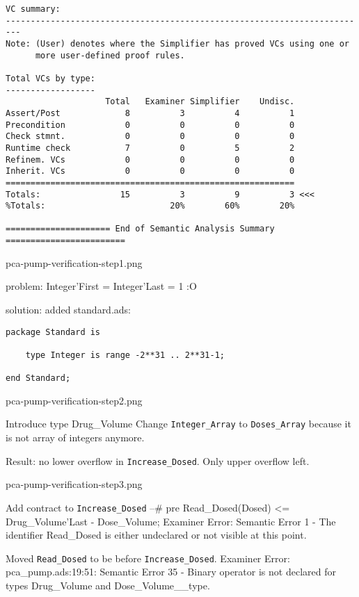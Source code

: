 \begin{lstlisting}
VC summary:
-------------------------------------------------------------------------
Note: (User) denotes where the Simplifier has proved VCs using one or
      more user-defined proof rules.

Total VCs by type:
------------------
                    Total   Examiner Simplifier    Undisc.
Assert/Post             8          3          4          1
Precondition            0          0          0          0
Check stmnt.            0          0          0          0
Runtime check           7          0          5          2
Refinem. VCs            0          0          0          0
Inherit. VCs            0          0          0          0
==========================================================
Totals:                15          3          9          3 <<<
%Totals:                         20%        60%        20%

===================== End of Semantic Analysis Summary ========================

\end{lstlisting}

pca-pump-verification-step1.png

problem: Integer'First = Integer'Last = 1 :O

solution: added standard.ads:

\begin{lstlisting}
package Standard is

    type Integer is range -2**31 .. 2**31-1;

end Standard;
\end{lstlisting}

pca-pump-verification-step2.png

Introduce type Drug\_Volume
Change \lstinline{Integer_Array} to \lstinline{Doses_Array} because it is not array of integers anymore.

Result: no lower overflow in \lstinline{Increase_Dosed}. Only upper overflow left.

pca-pump-verification-step3.png

Add contract to \lstinline{Increase_Dosed} --# pre Read_Dosed(Dosed) <= Drug_Volume'Last - Dose_Volume;
Examiner Error: Semantic Error   1 - The identifier Read_Dosed is either undeclared or not visible at this point.


Moved \lstinline{Read_Dosed} to be before \lstinline{Increase_Dosed}.
Examiner Error: pca_pump.ads:19:51: Semantic Error  35 - Binary operator is not declared for types Drug_Volume and Dose_Volume__type.

